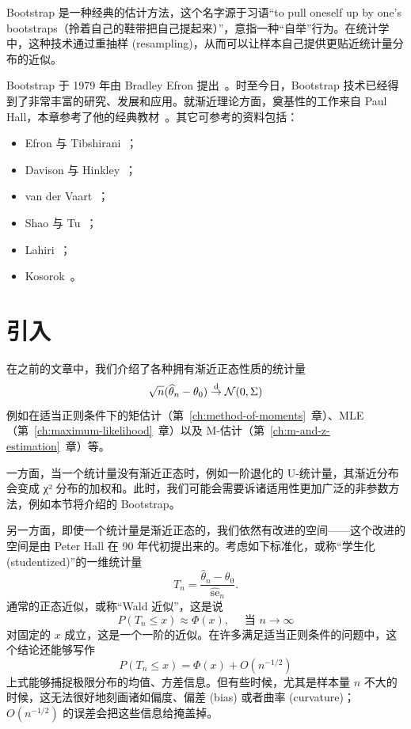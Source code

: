 Bootstrap 是一种经典的估计方法，这个名字源于习语“to pull oneself up by one's bootstraps（拎着自己的鞋带把自己提起来）”，意指一种“自举”行为。在统计学中，这种技术通过重抽样 (resampling)，从而可以让样本自己提供更贴近统计量分布的近似。

Bootstrap 于 1979 年由 Bradley Efron 提出~\cite{efron1979}。时至今日，Bootstrap 技术已经得到了非常丰富的研究、发展和应用。就渐近理论方面，奠基性的工作来自 Paul Hall，本章参考了他的经典教材~\cite{hall1992}。其它可参考的资料包括：
\begin{itemize}
\item Efron 与 Tibshirani~\cite{efrontibshirani1993}；
\item Davison 与 Hinkley~\cite{davisonhinkley1997}；
\item van der Vaart~\cite[第 23 章]{vandervaart1998}；
\item Shao 与 Tu~\cite{shaotu1996}；
\item Lahiri~\cite{lahiri2003}；
\item Kosorok~\cite{kosorok2008}。
\end{itemize}


\section{引入}

在之前的文章中，我们介绍了各种拥有渐近正态性质的统计量
\[\sqrt n(\widehat \theta_n-\theta_0)\overset{\rm d}\to\mathcal N(0,\Sigma)\]
例如在适当正则条件下的矩估计（第~\ref{ch:method-of-moments}~章）、MLE（第~\ref{ch:maximum-likelihood}~章）以及 M-估计（第~\ref{ch:m-and-z-estimation}~章）等。

一方面，当一个统计量没有渐近正态时，例如一阶退化的 U-统计量，其渐近分布会变成 χ² 分布的加权和。此时，我们可能会需要诉诸适用性更加广泛的非参数方法，例如本节将介绍的 Bootstrap。

另一方面，即使一个统计量是渐近正态的，我们依然有改进的空间------这个改进的空间是由 Peter Hall 在 90 年代初提出来的。考虑如下标准化，或称``学生化 (studentized)''的一维统计量
\[
T_n=\frac{\widehat{\theta}_n-\theta_0}{\widehat{\mathrm{se}}_n}.
\]
通常的正态近似，或称``Wald 近似''，这是说
$$P(T_n\leq x)\approx \Phi(x),\quad \text{ 当 }n\to\infty$$
对固定的 $x$ 成立，这是一个一阶的近似。在许多满足适当正则条件的问题中，这个结论还能够写作
\[P(T_n\leq x)=\Phi(x)+O(n^{-1/2})\]
上式能够捕捉极限分布的均值、方差信息。但有些时候，尤其是样本量 $n$ 不大的时候，这无法很好地刻画诸如偏度、偏差 (bias) 或者曲率 (curvature)； $O(n^{-1/2})$ 的误差会把这些信息给掩盖掉。

